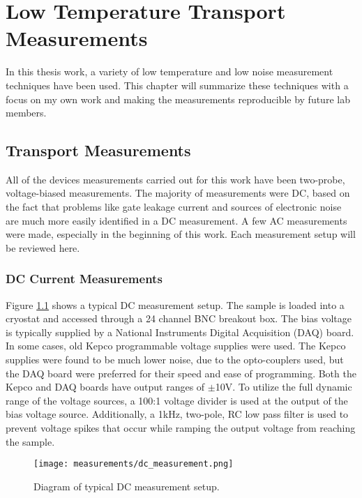 \chapter{Low Temperature Transport Measurements}
\label{sec:measurement}

In this thesis work, a variety of low temperature and low noise measurement techniques have been used. This chapter will summarize these techniques with a focus on my own work and making the measurements reproducible by future lab members. 

\section{Transport Measurements}

All of the devices measurements carried out for this work have been two-probe, voltage-biased measurements. The majority of measurements were DC, based on the fact that problems like gate leakage current and sources of electronic noise are much more easily identified in a DC measurement. A few AC measurements were made, especially in the beginning of this work. Each measurement setup will be reviewed here.

\subsection{DC Current Measurements}
\label{sec:DC}

Figure \ref{fig:dc_measurement} shows a typical DC measurement setup. The sample is loaded into a cryostat and accessed through a 24 channel BNC breakout box. The bias voltage is typically supplied by a National Instruments Digital Acquisition (DAQ) board. In some cases, old Kepco programmable voltage supplies were used. The Kepco supplies were found to be much lower noise, due to the opto-couplers used, but the DAQ board were preferred for their speed and ease of programming. Both the Kepco and DAQ boards have output ranges of $\pm$10V. To utilize the full dynamic range of the voltage sources, a 100:1 voltage divider is used at the output of the bias voltage source. Additionally, a 1kHz, two-pole, RC low pass filter is used to prevent voltage spikes that occur while ramping the output voltage from reaching the sample.

\begin{figure}
    \centering
    \texttt{[image: measurements/dc\_measurement.png]}
    \caption{Diagram of typical DC measurement setup.}
    \label{fig:dc_measurement}
\end{figure}

